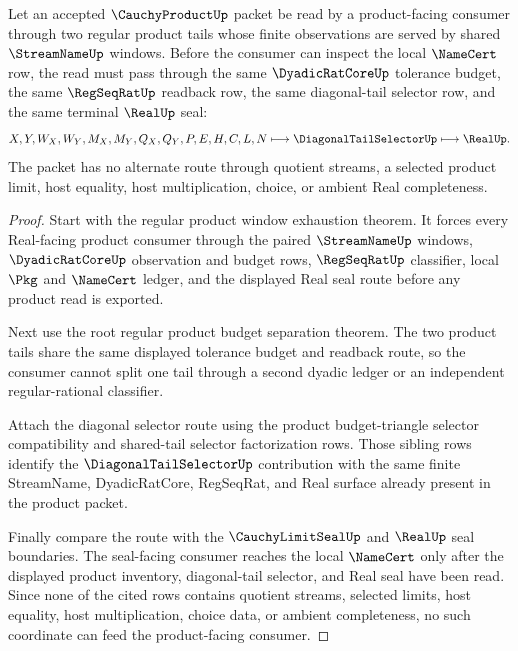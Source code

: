 \begin{theorem}
\label{thm:cauchy-product-regular-tail-diagonal-window-lock}
Let an accepted $\CauchyProductUp$ packet be read by a product-facing consumer through two regular product tails whose finite observations are served by shared $\StreamNameUp$ windows. Before the consumer can inspect the local $\NameCert$ row, the read must pass through the same $\DyadicRatCoreUp$ tolerance budget, the same $\RegSeqRatUp$ readback row, the same diagonal-tail selector row, and the same terminal $\RealUp$ seal:
$$
X,Y,W_X,W_Y,M_X,M_Y,Q_X,Q_Y,P,E,H,C,L,N
\longmapsto
\DiagonalTailSelectorUp
\longmapsto
\RealUp .
$$
The packet has no alternate route through quotient streams, a selected product limit, host equality, host multiplication, choice, or ambient Real completeness.
\end{theorem}
\begin{proof}
Start with the regular product window exhaustion theorem. It forces every Real-facing product consumer through the paired $\StreamNameUp$ windows, $\DyadicRatCoreUp$ observation and budget rows, $\RegSeqRatUp$ classifier, local $\Pkg$ and $\NameCert$ ledger, and the displayed Real seal route before any product read is exported.

Next use the root regular product budget separation theorem. The two product tails share the same displayed tolerance budget and readback route, so the consumer cannot split one tail through a second dyadic ledger or an independent regular-rational classifier.

Attach the diagonal selector route using the product budget-triangle selector compatibility and shared-tail selector factorization rows. Those sibling rows identify the $\DiagonalTailSelectorUp$ contribution with the same finite StreamName, DyadicRatCore, RegSeqRat, and Real surface already present in the product packet.

Finally compare the route with the $\CauchyLimitSealUp$ and $\RealUp$ seal boundaries. The seal-facing consumer reaches the local $\NameCert$ only after the displayed product inventory, diagonal-tail selector, and Real seal have been read. Since none of the cited rows contains quotient streams, selected limits, host equality, host multiplication, choice data, or ambient completeness, no such coordinate can feed the product-facing consumer.
\end{proof}

